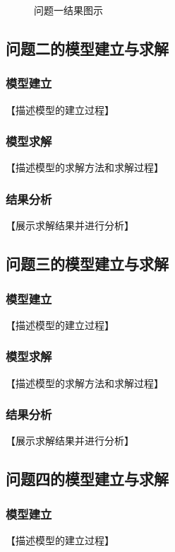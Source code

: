 \documentclass[12pt,a4paper]{ctexart}
\begin{document}
\begin{figure}[H]
\centering
\caption{问题一结果图示}
\label{fig:result1}
\end{figure}

\subsection{问题二的模型建立与求解}

\subsubsection{模型建立}
【描述模型的建立过程】

\subsubsection{模型求解}
【描述模型的求解方法和求解过程】

\subsubsection{结果分析}
【展示求解结果并进行分析】

\subsection{问题三的模型建立与求解}

\subsubsection{模型建立}
【描述模型的建立过程】

\subsubsection{模型求解}
【描述模型的求解方法和求解过程】

\subsubsection{结果分析}
【展示求解结果并进行分析】

\subsection{问题四的模型建立与求解}

\subsubsection{模型建立}
【描述模型的建立过程】
\end{document}
